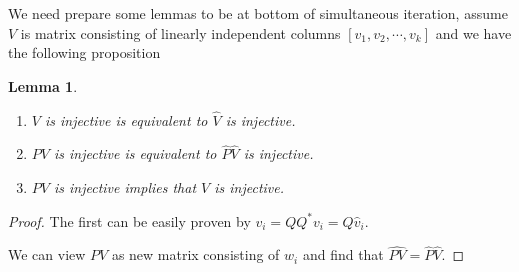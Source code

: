 \documentclass[11pt]{article}
\newtheorem{Lemma}[Theorem]{Lemma}
\begin{document}
We need prepare some lemmas to be at bottom of simultaneous iteration, assume $V$ is matrix consisting of linearly independent columns $[v_{1}, v_{2}, \cdots, v_{k}]$ and we have the following proposition
\begin{Lemma}
\begin{enumerate}
   \item $V$ is injective is equivalent to $\widehat{V}$ is injective.
   
   \item $PV$ is injective is equivalent to $\widehat{P}\widehat{V}$ is injective.
   
   \item $PV$ is injective implies that $V$ is injective.
\end{enumerate}
   
\end{Lemma}

\begin{proof}
   The first can be easily proven by $v_{i} = Q Q^{*} v_{i} = Q\widehat{v}_{i}$. 

   We can view $PV$ as new matrix consisting of $w_{i}$ and find that $\widehat{PV} = \widehat{P} \widehat{V}$.
\end{proof}
\end{document}
